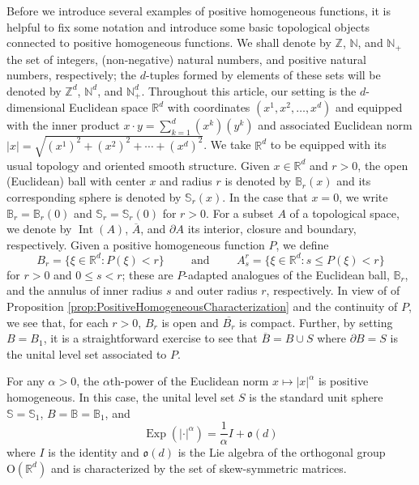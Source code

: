 \documentclass[11pt]{article}
\newenvironment{example}
  {\pushQED{\qed}\renewcommand{\qedsymbol}{$\triangle$}\examplex}
  {\popQED\endexamplex}
\theoremstyle{remark}
\newcommand\OdR{\mbox{O}(\mathbb{R}^d)} %
\newcommand\Exp{\operatorname{Exp}}
\newcommand\Interior{\operatorname{Int}}
\begin{document}
\noindent Before we introduce several examples of positive homogeneous functions, it is helpful to fix some notation and introduce some basic topological objects connected to positive homogeneous functions. We shall denote by $\mathbb{Z}$, $\mathbb{N}$, and $\mathbb{N}_+$ the set of integers, (non-negative) natural numbers, and positive natural numbers, respectively; the $d$-tuples formed by elements of these sets will be denoted by $\mathbb{Z}^d$, $\mathbb{N}^d$, and $\mathbb{N}_+^d$. Throughout this article, our setting is the $d$-dimensional Euclidean space $\mathbb{R}^d$ with coordinates $(x^1,x^2,\dots,x^d)$ and equipped with the inner product $x\cdot y=\sum_{k=1}^d(x^k)(y^k)$ and associated Euclidean norm $|x|=\sqrt{(x^1)^2+(x^2)^2+\cdots+(x^d)^2}$. We take $\mathbb{R}^d$ to be equipped with its usual topology and oriented smooth structure. Given $x\in\mathbb{R}^d$ and $r>0$, the open (Euclidean) ball with center $x$ and radius $r$ is denoted by $\mathbb{B}_r(x)$ and its corresponding sphere is denoted by $\mathbb{S}_r(x)$. In the case that $x=0$, we write $\mathbb{B}_r=\mathbb{B}_r(0)$ and $\mathbb{S}_r=\mathbb{S}_r(0)$ for $r>0$. For a subset $A$ of a topological space, we denote by $\Interior{(A)}$, $\overline{A}$, and $\partial A$ its interior, closure and boundary, respectively. Given a positive homogeneous function $P$, we define
\begin{equation*}
B_r=\{\xi\in\mathbb{R}^d:P(\xi)<r\}\hspace{1cm}\mbox{and}\hspace{1cm}A_s^r=\{\xi\in\mathbb{R}^d:s\leq P(\xi)<r\}
\end{equation*}
for $r>0$ and $0\leq s<r$; these are $P$-adapted analogues of the Euclidean ball, $\mathbb{B}_r$, and the annulus of inner radius $s$ and outer radius $r$, respectively. In view of of Proposition \ref{prop:PositiveHomogeneousCharacterization} and the continuity of $P$, we see that, for each $r>0$, $B_r$ is open and $\overline{B_r}$ is compact. Further, by setting $B=B_1$, it is a straightforward exercise to see that $\overline{B}=B\cup S$ where $\partial B=S$ is the unital level set associated to $P$.





\begin{example}\label{exp:EuclideanNorm}\normalfont
For any $\alpha>0$, the $\alpha$th-power of the Euclidean norm $x\mapsto |x|^\alpha$ is positive homogeneous.  In this case, the unital level set $S$ is the standard unit sphere $\mathbb{S}=\mathbb{S}_1$, $B=\mathbb{B}=\mathbb{B}_1$, and
\begin{equation*}
    \Exp(|\cdot|^\alpha)=\frac{1}{\alpha}I+\mathfrak{o}(d)
\end{equation*}
where $I$ is the identity and $\mathfrak{o}(d)$ is the Lie algebra of the orthogonal group $\OdR$ and is characterized by the set of skew-symmetric matrices. 
\end{example}
\end{document}
